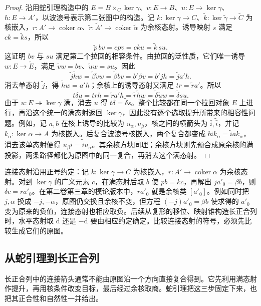 \begin{proof}
	沿用蛇引理构造中的 \(E=B\times_C\ker\gamma\)、\(v:E\to B\)、\(u:E\to\ker\gamma\)、\(h:E\to A'\)，以波浪号表示第二张图中的构造。记 \(k:\ker\gamma\to C\)、\(\widetilde k:\ker\widetilde\gamma\to\widetilde C\) 为核嵌入，\(r:A'\to\operatorname{coker}\alpha\)、\(\widetilde r:\widetilde A'\to\operatorname{coker}\widetilde\alpha\) 为余核态射。诱导映射 \(s\) 满足 \(ck=\widetilde k s\)，所以
	\[
		\widetilde p\,bv=cpv=cku=\widetilde k\,su.
	\]
	这证明 \(bv\) 与 \(su\) 满足第二个拉回的相容条件。由拉回的泛性质，它们唯一诱导 \(w:E\to\widetilde E\)，满足 \(\widetilde v w=bv\)、\(\widetilde u w=su\)。因此
	\[
		\widetilde j\widetilde h w =\widetilde\beta\widetilde v w =\widetilde\beta bv =b'\beta v =b'jh =\widetilde j a'h.
	\]
	消去单态射 \(\widetilde j\)，得 \(\widetilde h w=a'h\)；余核上的诱导态射又满足 \(t r=\widetilde r a'\)。所以
	\[
		t\delta u=trh=\widetilde r a'h =\widetilde r\widetilde h w =\widetilde\delta\widetilde u w =\widetilde\delta s u.
	\]
	由于 \(u:E\twoheadrightarrow\ker\gamma\) 满，消去 \(u\) 得 \(t\delta=\widetilde\delta s\)。整个比较都在同一个拉回对象 \(E\) 上进行，再沿这个统一的满态射返回 \(\ker\gamma\)，因此没有逐个选取提升所带来的相容性问题。例如，记 \(a,b\) 在核上诱导的比较为 \(u_\alpha,u_\beta\)，核之间的横箭头为 \(\bar i,\widetilde{\bar i}\)，并记 \(k_\alpha:\ker\alpha\to A\) 为核嵌入。后复合波浪号核嵌入，两个复合都变成 \(bik_\alpha=\widetilde iak_\alpha\)，消去该单态射便得 \(u_\beta\bar i=\widetilde{\bar i}u_\alpha\)。其余核方块同理；余核方块则先预合成原余核的满投影，两条路径都化为原图中的同一复合，再消去这个满态射。
\end{proof}

连接态射沿用正号约定：记 \(k:\ker\gamma\to C\) 为核嵌入，\(r:A'\to\operatorname{coker}\alpha\) 为余核态射。对到 \(\ker\gamma\) 的广义元素 \(c\)，在满态射后取 \(b\) 使 \(pb=kc\)，再解出 \(j a'_0=\beta b\)，则 \(\delta c=r a'_0\)。在第二卷第三章的模论版本中，\(r a'_0\) 就是余核类 \([a'_0]\)。例如同时把 \(j,\alpha\) 换成 \(-j,-\alpha\)，原图仍交换且余核不变，但方程 \((-j)a'_0=\beta b\) 使求得的 \(a'_0\) 变为原来的负值，连接态射也相应取负。后续从复形的移位、映射锥构造长正合列时，水平态射取 \(\mathrm{d}\) 还是 \(-\mathrm{d}\) 要由相应约定确定。比较连接态射的符号，必须先比较生成它们的原图。

\subsection{从蛇引理到长正合列}
\label{b4:subsec:0404:03}

长正合列中的连接箭头通常不能由原图沿一个方向直接复合得到。它先利用满态射作提升，再用核条件改变目标，最后经过余核取商。蛇引理把这三步固定下来，也把其正合性和自然性一并给出。

